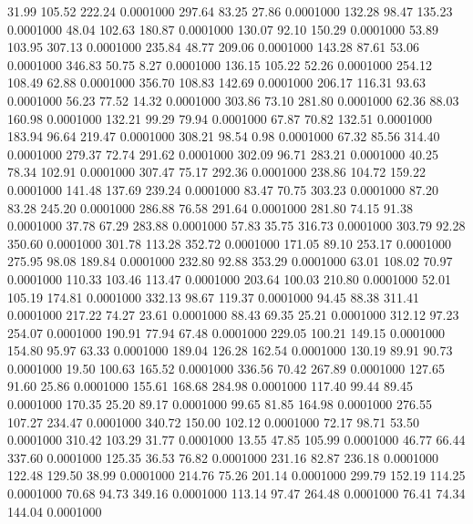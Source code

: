   31.99  105.52  222.24   0.0001000
 297.64   83.25   27.86   0.0001000
 132.28   98.47  135.23   0.0001000
  48.04  102.63  180.87   0.0001000
 130.07   92.10  150.29   0.0001000
  53.89  103.95  307.13   0.0001000
 235.84   48.77  209.06   0.0001000
 143.28   87.61   53.06   0.0001000
 346.83   50.75    8.27   0.0001000
 136.15  105.22   52.26   0.0001000
 254.12  108.49   62.88   0.0001000
 356.70  108.83  142.69   0.0001000
 206.17  116.31   93.63   0.0001000
  56.23   77.52   14.32   0.0001000
 303.86   73.10  281.80   0.0001000
  62.36   88.03  160.98   0.0001000
 132.21   99.29   79.94   0.0001000
  67.87   70.82  132.51   0.0001000
 183.94   96.64  219.47   0.0001000
 308.21   98.54    0.98   0.0001000
  67.32   85.56  314.40   0.0001000
 279.37   72.74  291.62   0.0001000
 302.09   96.71  283.21   0.0001000
  40.25   78.34  102.91   0.0001000
 307.47   75.17  292.36   0.0001000
 238.86  104.72  159.22   0.0001000
 141.48  137.69  239.24   0.0001000
  83.47   70.75  303.23   0.0001000
  87.20   83.28  245.20   0.0001000
 286.88   76.58  291.64   0.0001000
 281.80   74.15   91.38   0.0001000
  37.78   67.29  283.88   0.0001000
  57.83   35.75  316.73   0.0001000
 303.79   92.28  350.60   0.0001000
 301.78  113.28  352.72   0.0001000
 171.05   89.10  253.17   0.0001000
 275.95   98.08  189.84   0.0001000
 232.80   92.88  353.29   0.0001000
  63.01  108.02   70.97   0.0001000
 110.33  103.46  113.47   0.0001000
 203.64  100.03  210.80   0.0001000
  52.01  105.19  174.81   0.0001000
 332.13   98.67  119.37   0.0001000
  94.45   88.38  311.41   0.0001000
 217.22   74.27   23.61   0.0001000
  88.43   69.35   25.21   0.0001000
 312.12   97.23  254.07   0.0001000
 190.91   77.94   67.48   0.0001000
 229.05  100.21  149.15   0.0001000
 154.80   95.97   63.33   0.0001000
 189.04  126.28  162.54   0.0001000
 130.19   89.91   90.73   0.0001000
  19.50  100.63  165.52   0.0001000
 336.56   70.42  267.89   0.0001000
 127.65   91.60   25.86   0.0001000
 155.61  168.68  284.98   0.0001000
 117.40   99.44   89.45   0.0001000
 170.35   25.20   89.17   0.0001000
  99.65   81.85  164.98   0.0001000
 276.55  107.27  234.47   0.0001000
 340.72  150.00  102.12   0.0001000
  72.17   98.71   53.50   0.0001000
 310.42  103.29   31.77   0.0001000
  13.55   47.85  105.99   0.0001000
  46.77   66.44  337.60   0.0001000
 125.35   36.53   76.82   0.0001000
 231.16   82.87  236.18   0.0001000
 122.48  129.50   38.99   0.0001000
 214.76   75.26  201.14   0.0001000
 299.79  152.19  114.25   0.0001000
  70.68   94.73  349.16   0.0001000
 113.14   97.47  264.48   0.0001000
  76.41   74.34  144.04   0.0001000
